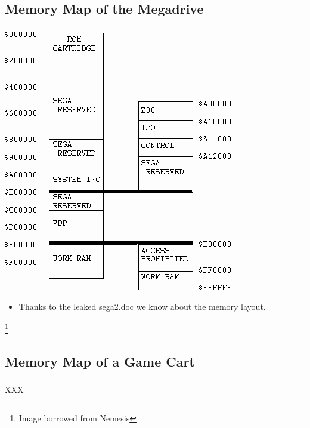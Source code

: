 \documentclass{beamer}
\begin{document}

\subsection{Memory Map of the Megadrive}

\begin{frame}[fragile]
\frametitle{\insertsubsection}

\begin{center}
\includegraphics[height=.7\textheight]{img/mmap.png}
\end{center}
\vspace{-1em}

\begin{itemize}
\item {\small Thanks to the leaked sega2.doc we know about the memory layout.}
\end{itemize}

\footnote{Image borrowed from Nemesis}

\end{frame}


\subsection{Memory Map of a Game Cart}

\begin{frame}[fragile]
\frametitle{\insertsubsection}

XXX

\end{frame}
\end{document}
